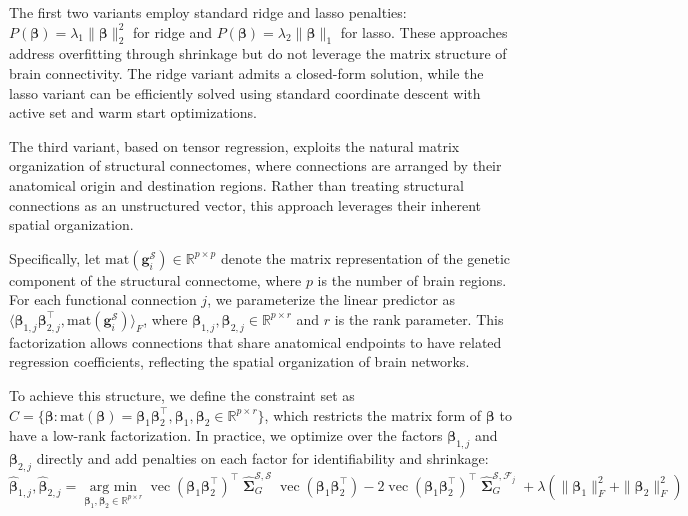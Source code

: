 \documentclass[12pt]{article}
\newcommand{\argmin}{\operatorname*{arg \ min}}
\DeclareMathOperator{\bSigma}{\mathbf{\Sigma}}
\DeclareMathOperator{\vect}{vec}
\begin{document}
The first two variants employ standard ridge and lasso penalties: $P(\boldsymbol{\beta}) = \lambda_1 \|\boldsymbol{\beta}\|_2^2$ for ridge and $P(\boldsymbol{\beta}) = \lambda_2 \|\boldsymbol{\beta}\|_1$ for lasso. These approaches address overfitting through shrinkage but do not leverage the matrix structure of brain connectivity. The ridge variant admits a closed-form solution, while the lasso variant can be efficiently solved using standard coordinate descent with active set and warm start optimizations.

The third variant, based on tensor regression, exploits the natural matrix organization of structural connectomes, where connections are arranged by their anatomical origin and destination regions. Rather than treating structural connections as an unstructured vector, this approach leverages their inherent spatial organization.

Specifically, let $\text{mat}(\mathbf{g}_i^{\mathcal{S}}) \in \mathbb{R}^{p \times p}$ denote the matrix representation of the genetic component of the structural connectome, where $p$ is the number of brain regions. For each functional connection $j$, we parameterize the linear predictor as $\langle \boldsymbol{\beta}_{1,j} \boldsymbol{\beta}_{2,j}^\top, \text{mat}(\mathbf{g}_i^{\mathcal{S}}) \rangle_F$, where $\boldsymbol{\beta}_{1,j}, \boldsymbol{\beta}_{2,j} \in \mathbb{R}^{p \times r}$ and $r$ is the rank parameter. This factorization allows connections that share anatomical endpoints to have related regression coefficients, reflecting the spatial organization of brain networks.

To achieve this structure, we define the constraint set as $C = \{\boldsymbol{\beta} : \text{mat}(\boldsymbol{\beta}) = \boldsymbol{\beta}_1 \boldsymbol{\beta}_2^\top, \boldsymbol{\beta}_1, \boldsymbol{\beta}_2 \in \mathbb{R}^{p \times r}\}$, which restricts the matrix form of $\boldsymbol{\beta}$ to have a low-rank factorization. In practice, we optimize over the factors $\boldsymbol{\beta}_{1,j}$ and $\boldsymbol{\beta}_{2,j}$ directly and add penalties on each factor for identifiability and shrinkage:
\begin{equation}\label{eq:tensor_regression}
\hat{\boldsymbol{\beta}}_{1,j}, \hat{\boldsymbol{\beta}}_{2,j} = \argmin_{\boldsymbol{\beta}_1, \boldsymbol{\beta}_2 \in \mathbb{R}^{p \times r}} \vect(\boldsymbol{\beta}_1\boldsymbol{\beta}_2^\top)^\top \hat{\bSigma}_G^{\mathcal{S},\mathcal{S}} \vect(\boldsymbol{\beta}_1\boldsymbol{\beta}_2^\top) - 2\vect(\boldsymbol{\beta}_1\boldsymbol{\beta}_2^\top)^\top \hat{\bSigma}_G^{\mathcal{S},\mathcal{F}_j} + \lambda\left(\|\boldsymbol{\beta}_1\|_F^2 + \|\boldsymbol{\beta}_2\|_F^2\right)
\end{equation}
\end{document}
